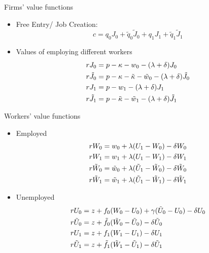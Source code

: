 \documentclass[9pt,xcolor={svgnames}]{beamer}
\begin{document}
\begin{frame}{Firms' value functions}
\begin{itemize}
\setlength\itemsep{1.8em}

    \item Free Entry/ Job Creation: 
    \smallskip
    \begin{equation*}
        c = q_0J_0 + \tilde{q}_0\tilde{J}_0 + q_1J_1 + \tilde{q}_1\tilde{J}_1
        \end{equation*}

 \item Values of employing different workers
 \smallskip
    \begin{align*}
    rJ_0 &= p-\kappa - w_0 - (\lambda + \delta) J_0 \\
    \smallskip
    r\tilde{J}_0 &= p-\kappa-\Tilde{\kappa}-\tilde{w}_0-(\lambda + \delta)\tilde{J}_0 \\
    \smallskip
    rJ_1 &= p-w_1-(\lambda + \delta)J_1 \\
    \smallskip
    r\tilde{J}_1 &=p-\tilde{\kappa}-\tilde{w}_1-(\lambda + \delta) \tilde{J}_1
\end{align*}

\end{itemize}
\end{frame}


\begin{frame}{Workers' value functions}

\begin{itemize}
\setlength\itemsep{1.8em}
\item Employed
\smallskip
\begin{align*}
    rW_0 &=w_0+\lambda(U_1-W_0)- \delta W_0 \\
    \smallskip
    rW_1 &=w_1+\lambda(U_1-W_1)- \delta W_1 \\
    \smallskip
    r\tilde{W}_0 &=\tilde{w}_0+\lambda(\tilde{U}_1-\tilde{W}_0)- \delta \tilde{W}_0 \\
    \smallskip
    r\tilde{W}_1 &=\tilde{w}_1+\lambda(\tilde{U}_1-\tilde{W}_1)- \delta \tilde{W}_1
\end{align*}

\item Unemployed
\smallskip
\begin{align*}
    rU_0 &=z+f_0(W_0-U_0)+\gamma(\tilde{U}_0-U_0) - \delta U_0 \\
    \smallskip
    r\tilde{U}_0 &=z+\tilde{f}_0(\tilde{W}_0-\tilde{U}_0)- \delta \tilde{U}_0 \\
    \smallskip
     r U_{1} &=z+f_1(W_1-U_1)- \delta U_1 \\
     \smallskip
    r\tilde{U}_1 &=z+\tilde{f}_1(\tilde{W}_1-\tilde{U}_1)- \delta \tilde{U}_1
\end{align*}
\end{itemize}
\end{frame}
\end{document}
